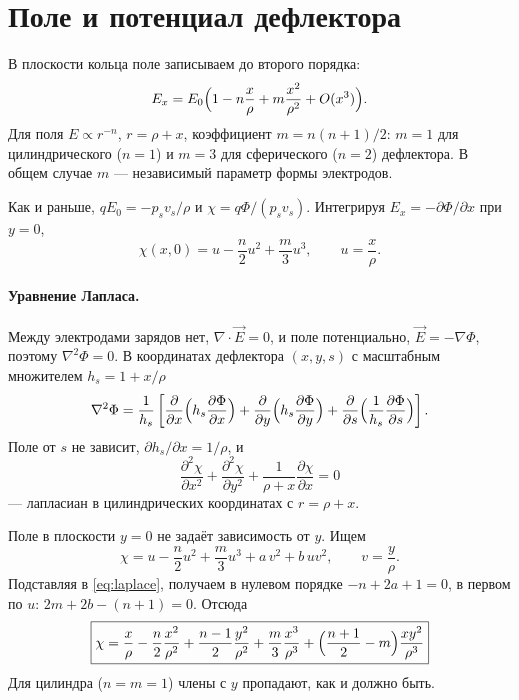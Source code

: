 \documentclass[12pt,a4paper]{article}
\numberwithin{equation}{section}
\begin{document}
\section{Поле и потенциал дефлектора}

В плоскости кольца поле записываем до второго порядка:
\begin{equation}\label{eq:Ex}
E_x=E_0\Bigl(1-n\frac{x}{\rho}+m\frac{x^2}{\rho^2}+O(x^3)\Bigr).
\end{equation}
Для поля $E\propto r^{-n}$, $r=\rho+x$, коэффициент $m=n(n+1)/2$: $m=1$ для цилиндрического
($n=1$) и $m=3$ для сферического ($n=2$) дефлектора. В общем случае $m$ --- независимый параметр
формы электродов.

Как и раньше, $qE_0=-p_sv_s/\rho$ и $\chi=q\Phi/(p_sv_s)$. Интегрируя $E_x=-\partial\Phi/\partial x$ при $y=0$,
\begin{equation}\label{eq:chi0}
\chi(x,0)=u-\frac n2u^2+\frac m3u^3,\qquad u=\frac x\rho .
\end{equation}

\paragraph{Уравнение Лапласа.} Между электродами зарядов нет, $\nabla\cdot\vec E=0$, и поле
потенциально, $\vec E=-\nabla\Phi$, поэтому $\nabla^2\Phi=0$. В координатах дефлектора
$(x,y,s)$ с масштабным множителем $h_s=1+x/\rho$
\begin{equation}
\nabla^2\Phi=\frac{1}{h_s}\left[\frac{\partial}{\partial x}\Bigl(h_s\frac{\partial\Phi}{\partial x}\Bigr)
+\frac{\partial}{\partial y}\Bigl(h_s\frac{\partial\Phi}{\partial y}\Bigr)
+\frac{\partial}{\partial s}\Bigl(\frac{1}{h_s}\frac{\partial\Phi}{\partial s}\Bigr)\right].
\end{equation}
Поле от $s$ не зависит, $\partial h_s/\partial x=1/\rho$, и
\begin{equation}\label{eq:laplace}
\frac{\partial^2\chi}{\partial x^2}+\frac{\partial^2\chi}{\partial y^2}
+\frac{1}{\rho+x}\frac{\partial\chi}{\partial x}=0
\end{equation}
--- лапласиан в цилиндрических координатах с $r=\rho+x$.

Поле в плоскости $y=0$ не задаёт зависимость от $y$. Ищем
\begin{equation}
\chi=u-\frac n2u^2+\frac m3u^3+a\,v^2+b\,uv^2,\qquad v=\frac y\rho .
\end{equation}
Подставляя в \eqref{eq:laplace}, получаем в нулевом порядке $-n+2a+1=0$, в первом по $u$:
$2m+2b-(n+1)=0$. Отсюда
\begin{equation}\label{eq:chi}
\boxed{\chi=\frac x\rho-\frac n2\frac{x^2}{\rho^2}+\frac{n-1}{2}\frac{y^2}{\rho^2}
+\frac m3\frac{x^3}{\rho^3}+\Bigl(\frac{n+1}{2}-m\Bigr)\frac{xy^2}{\rho^3}}
\end{equation}
Для цилиндра ($n=m=1$) члены с $y$ пропадают, как и должно быть.
\end{document}
